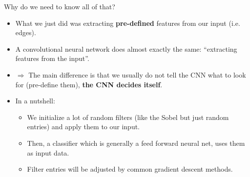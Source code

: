 {    \begin{itemize}
    \end{itemize}
}
\begin{vbframe}{Why do we need to know all of that?}
  \begin{itemize}
    \item What we just did was extracting \textbf{pre-defined} features from our input (i.e. edges).
    \item A convolutional neural network does almost exactly the same: \enquote{extracting features from the input}.
    \item[] $\Rightarrow$ The main difference is that we usually do not tell the CNN what to look for (pre-define them), \textbf{the CNN decides itself}.
    \item In a nutshell:
    \begin{itemize}
      \item We initialize a lot of random filters (like the Sobel but just random entries) and apply them to our input.
      \item Then, a classifier which is generally a feed forward neural net, uses them as input data.
      \item Filter entries will be adjusted by common gradient descent methods.
    \end{itemize}
  \end{itemize}
\end{vbframe}
